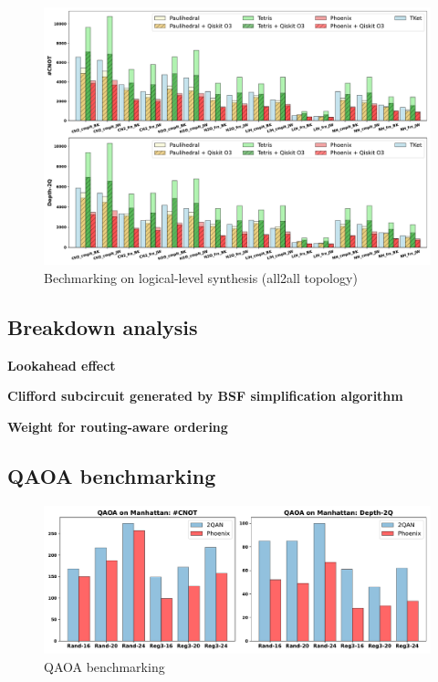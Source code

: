 \documentclass[conference]{IEEEtran}
\begin{document}
\begin{figure}[tbp]
    \centering
    \includegraphics[width=\columnwidth]{figures/all2all.pdf}
    \caption{Bechmarking on logical-level synthesis (all2all topology)}
    \label{fig:all2all}
\end{figure}


\subsection{Breakdown analysis}

\textbf{Lookahead effect}


\textbf{Clifford subcircuit generated by BSF simplification algorithm}


\textbf{Weight for routing-aware ordering}


\subsection{QAOA benchmarking}



\begin{figure}[tbp]
    \centering
    \includegraphics[width=\columnwidth]{figures/qaoa.pdf}
    \caption{QAOA benchmarking}
    \label{fig:qaoa}
\end{figure}
\end{document}

